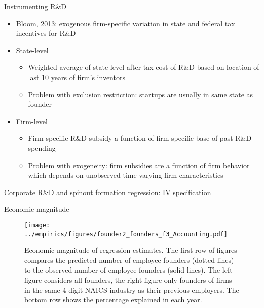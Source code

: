 \documentclass[english,usenames,dvipsnames]{beamer}
\begin{document}
\begin{frame}{Instrumenting R\&D}
\begin{itemize}
	\item Bloom, 2013: exogenous firm-specific variation in state and federal tax incentives for R\&D
	\item State-level
	\begin{itemize}
		\item Weighted average of state-level after-tax cost of R\&D based on location of last 10 years of firm's inventors
		\item Problem with exclusion restriction: startups are usually in same state as founder
	\end{itemize}
	\item Firm-level
	\begin{itemize}
		\item Firm-specific R\&D subsidy a function of firm-specific base of past R\&D spending
		\item Problem with exogeneity: firm subsidies are a function of firm behavior which depends on unobserved time-varying firm characteristics
	\end{itemize}
\end{itemize}
\end{frame}

\begin{frame}{Corporate R\&D and spinout formation regression: IV specification}
\begin{table}
\Tiny
\centering

\caption{\tiny The dependent variable is the log of the average yearly number of founders from the parent firm joining startups, over the years $t+1,t+2,t+3$. Independent variables are similarly averaged over $t,t-1,t-2$. Columns (1) and (5) are estimated by OLS. The remaining columns columns are estimated by instrumenting R\&D spending using firm-specific tax incentives for R\&D, from Bloom 2013. Standard errors are clustered at the firm level.}
\label{table:RDandSpinoutFormation_iv_founder2_l3f3}
\end{table}
\end{frame}

\begin{frame}{Economic magnitude}
\begin{figure}[!htb]
	\texttt{[image: ../empirics/figures/founder2\_founders\_f3\_Accounting.pdf]}
	\caption{\tiny Economic magnitude of regression estimates. The first row of figures compares the predicted number of employee founders (dotted lines) to the observed number of employee founders (solid lines). The left figure considers all founders, the right figure only founders of firms in the same 4-digit NAICS industry as their previous employers. The bottom row shows the percentage explained in each year.}
\end{figure}
\end{frame}
\end{document}
